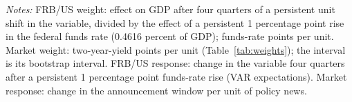 \begin{table}[tbp]\centering\small
\caption{FRB/US and Market Weights on the Three Common Variables}\label{tab:frbus}
\begin{flushleft}\footnotesize\textit{Notes:} FRB/US weight: effect on GDP after four quarters of a persistent unit shift in the variable, divided by the effect of a persistent 1 percentage point rise in the federal funds rate (0.4616 percent of GDP); funds-rate points per unit. Market weight: two-year-yield points per unit (Table~\ref{tab:weights}); the interval is its bootstrap interval. FRB/US response: change in the variable four quarters after a persistent 1 percentage point funds-rate rise (VAR expectations). Market response: change in the announcement window per unit of policy news.\end{flushleft}
\end{table}
